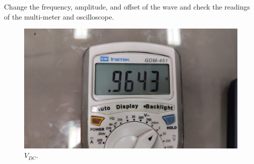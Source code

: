 \documentclass[11pt]{article}
\newcommand{\PicScale}{0.2}
\begin{document}
\begin{question}
\begin{subquestion}{Change the frequency, amplitude, and offset of the wave and check the readings of the multi-meter and oscilloscope.}
{    \begin{figure}[H]
        \begin{center}
            \includegraphics[scale=\PicScale]{Fig/26.jpeg}
            \caption{$V_{DC}$.}
        \end{center}
    \end{figure}

}
\end{subquestion}
\end{question}
\end{document}
